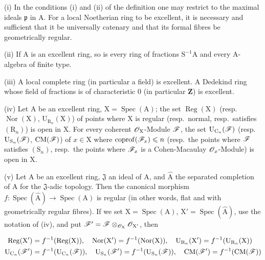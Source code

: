 \begin{scholium}[7.8.3]
\label{IV.7.8.3}
\textup{(i)} In the conditions \textup{(i)} and \textup{(ii)} of the definition  one may restrict to the maximal ideals $\mathfrak{p}$ in $\mathrm{A}$. For a \textup{local} Noetherian ring to be excellent, it is necessary and
sufficient that it be universally catenary and that its formal fibres be geometrically regular.

\textup{(ii)} If $\mathrm{A}$ is an excellent ring, so is every ring of fractions $\mathrm{S}^{-1}\mathrm{A}$ and every $\mathrm{A}$-algebra of finite type.

\textup{(iii)} A local complete ring (in particular a field) is excellent. A Dedekind ring whose field of fractions is of characteristic $0$ (in particular $\mathbf{Z}$) is excellent.

\textup{(iv)} Let $\mathrm{A}$ be an excellent ring, $\mathrm{X}=\operatorname{Spec}(\mathrm{A})$; the set $\operatorname{Reg}(\mathrm{X})$ \textup{(resp.}\ $\operatorname{Nor}(\mathrm{X})$, $\mathrm{U}_{\mathrm{R}_n}(\mathrm{X})$) of points where $\mathrm{X}$ is regular \textup{(resp.}\ normal, \textup{resp.}\ satisfies $(\mathrm{R}_n)$) is open in $\mathrm{X}$. For every coherent $\mathscr{O}_\mathrm{X}$-Module $\mathscr{F}$, the set $\mathrm{U}_{\mathrm{C}_n}(\mathscr{F})$ \textup{(resp.}\ $\mathrm{U}_{\mathrm{S}_n}(\mathscr{F})$, $\mathrm{CM}(\mathscr{F})$) of $x\in\mathrm{X}$ where $\operatorname{coprof}(\mathscr{F}_x)\leqslant n$ \textup{(resp.}\ the points where $\mathscr{F}$ satisfies $(\mathrm{S}_n)$, \textup{resp.}\ the points where $\mathscr{F}_x$ is a Cohen-Macaulay $\mathscr{O}_x$-Module) is open in $\mathrm{X}$.

\textup{(v)} Let $\mathrm{A}$ be an excellent ring, $\mathfrak{J}$ an ideal of $\mathrm{A}$, and $\widehat{\mathrm{A}}$ the separated completion of $\mathrm{A}$ for the $\mathfrak{J}$-adic topology. Then the canonical morphism $f:\operatorname{Spec}(\widehat{\mathrm{A}})\to\operatorname{Spec}(\mathrm{A})$ is regular \textup{(in other words,} flat \textup{and with} geometrically regular fibres). If we set $\mathrm{X}=\operatorname{Spec}(\mathrm{A})$, $\mathrm{X}'=\operatorname{Spec}(\widehat{\mathrm{A}})$, use the notation of \textup{(iv)}, and put $\mathscr{F}'=\mathscr{F}\otimes_{\mathscr{O}_\mathrm{X}}\mathscr{O}_{\mathrm{X}'}$, then

\begin{env}[7.8.3.1]
\label{IV.7.8.3.1}
\begin{align*}
  \operatorname{Reg}(\mathrm{X}')&=f^{-1}(\operatorname{Reg}(\mathrm{X})),\quad \operatorname{Nor}(\mathrm{X}')=f^{-1}(\operatorname{Nor}(\mathrm{X})),\quad \mathrm{U}_{\mathrm{R}_n}(\mathrm{X}')=f^{-1}(\mathrm{U}_{\mathrm{R}_n}(\mathrm{X}))\\
  \mathrm{U}_{\mathrm{C}_n}(\mathscr{F}')&=f^{-1}(\mathrm{U}_{\mathrm{C}_n}(\mathscr{F})),\quad \mathrm{U}_{\mathrm{S}_n}(\mathscr{F}')=f^{-1}(\mathrm{U}_{\mathrm{S}_n}(\mathscr{F})),\quad \mathrm{CM}(\mathscr{F}')=f^{-1}(\mathrm{CM}(\mathscr{F}))
\end{align*}
\end{env}


\end{scholium}
